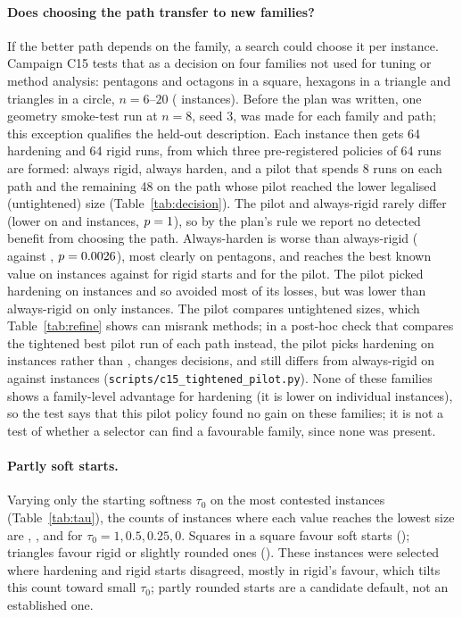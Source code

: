 \paragraph{Does choosing the path transfer to new families?} If the better path depends on the family, a search could choose it per instance. Campaign C15 tests that as a decision on four families not used for tuning or method analysis: pentagons and octagons in a square, hexagons in a triangle and triangles in a circle, $n=6$--$20$ (\DecN{} instances). Before the plan was written, one geometry smoke-test run at $n=8$, seed 3, was made for each family and path; this exception qualifies the held-out description. Each instance then gets 64 hardening and 64 rigid runs, from which three pre-registered policies of 64 runs are formed: always rigid, always harden, and a pilot that spends 8 runs on each path and the remaining 48 on the path whose pilot reached the lower legalised (untightened) size (Table~\ref{tab:decision}). The pilot and always-rigid rarely differ (lower on \DecPilotLower{} and \DecRigidLower{} instances, $p=1$), so by the plan's rule we report no detected benefit from choosing the path. Always-harden is worse than always-rigid (\DecHLower{} against \DecHRLower, $p=0.0026$), most clearly on pentagons, and reaches the best known value on \DecReachedHarden{} instances against \DecReachedRigid{} for rigid starts and \DecReachedPilot{} for the pilot. The pilot picked hardening on \DecPicked{} instances and so avoided most of its losses, but was lower than always-rigid on only \DecPilotLower{} instances. The pilot compares untightened sizes, which Table~\ref{tab:refine} shows can misrank methods; in a post-hoc check that compares the tightened best pilot run of each path instead, the pilot picks hardening on \DecTPicked{} instances rather than \DecPicked, changes \DecTChanged{} decisions, and still differs from always-rigid on \DecTLower{} against \DecTRLower{} instances (\texttt{scripts/c15\_tightened\_pilot.py}). None of these families shows a family-level advantage for hardening (it is lower on \DecHLower{} individual instances), so the test says that this pilot policy found no gain on these families; it is not a test of whether a selector can find a favourable family, since none was present.


\paragraph{Partly soft starts.} Varying only the starting softness $\tau_0$ on the \CtauN{} most contested instances (Table~\ref{tab:tau}), the counts of instances where each value reaches the lowest size are \CtauOne, \CtauHalf, \CtauQuarter{} and \CtauZero{} for $\tau_0=1, 0.5, 0.25, 0$. Squares in a square favour soft starts (\CtauSquares{}); triangles favour rigid or slightly rounded ones (\CtauTriangles{}). These instances were selected where hardening and rigid starts disagreed, mostly in rigid's favour, which tilts this count toward small $\tau_0$; partly rounded starts are a candidate default, not an established one.

